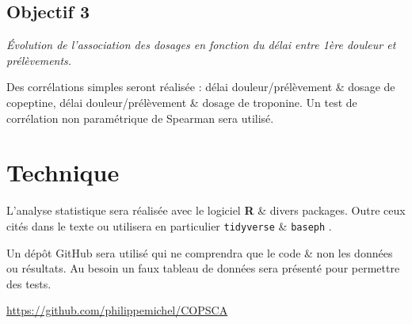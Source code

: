 \documentclass[
  a4paperpaper,
  french,
  oneside,
  open=any]{scrreprt}
\begin{document}
\hypertarget{objectif-3}{%
\section{Objectif 3}\label{objectif-3}}

\emph{Évolution de l'association des dosages en fonction du délai entre
1ère douleur et prélèvements.}

Des corrélations simples seront réalisée : délai douleur/prélèvement \&
dosage de copeptine, délai douleur/prélèvement \& dosage de troponine.
Un test de corrélation non paramétrique de Spearman sera utilisé.

\hypertarget{technique}{%
\chapter{Technique}\label{technique}}

L'analyse statistique sera réalisée avec le logiciel
\textbf{R}\autocite{rstat} \& divers packages. Outre ceux cités dans le
texte ou utilisera en particulier \texttt{tidyverse} \autocite{tidy} \&
\texttt{baseph} \autocite{baseph}.

Un dépôt GitHub sera utilisé qui ne comprendra que le code \& non les
données ou résultats. Au besoin un faux tableau de données sera présenté
pour permettre des tests.

\url{https://github.com/philippemichel/COPSCA}


\printbibliography
\end{document}

